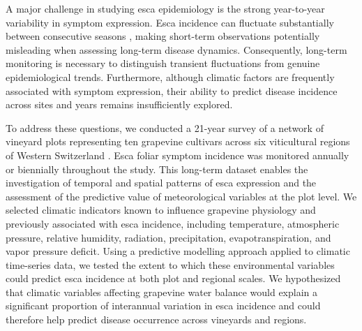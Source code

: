 A major challenge in studying esca epidemiology is the strong year-to-year variability in symptom expression. Esca incidence can fluctuate substantially between consecutive seasons \citep{calzarano_rainfall_2018,etienne_exploring_2024,etienne_identification_2026}, making short-term observations potentially misleading when assessing long-term disease dynamics. Consequently, long-term monitoring is necessary to distinguish transient fluctuations from genuine epidemiological trends. Furthermore, although climatic factors are frequently associated with symptom expression, their ability to predict disease incidence across sites and years remains insufficiently explored.

To address these questions, we conducted a 21-year survey of a network of vineyard plots representing ten grapevine cultivars across six viticultural regions of Western Switzerland . Esca foliar symptom incidence was monitored annually or biennially throughout the study. This long-term dataset enables the investigation of temporal and spatial patterns of esca expression and the assessment of the predictive value of meteorological variables at the plot level. We selected climatic indicators known to influence grapevine physiology and previously associated with esca incidence, including temperature, atmospheric pressure, relative humidity, radiation, precipitation, evapotranspiration, and vapor pressure deficit. Using a predictive modelling approach applied to climatic time-series data, we tested the extent to which these environmental variables could predict esca incidence at both plot and regional scales. We hypothesized that climatic variables affecting grapevine water balance would explain a significant proportion of interannual variation in esca incidence and could therefore help predict disease occurrence across vineyards and regions.
